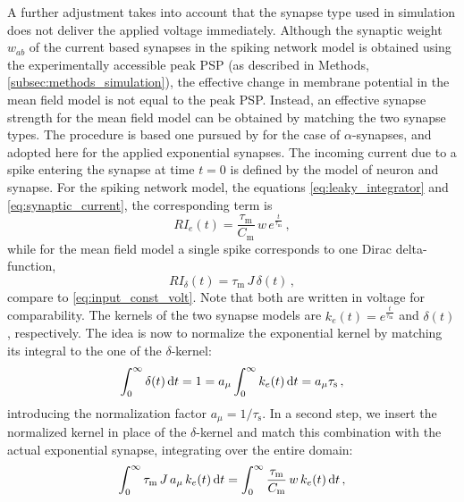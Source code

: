 A further adjustment takes into account that the synapse type used in simulation does not
deliver the applied voltage immediately. Although the synaptic weight $w_{ab}$ of the 
current based synapses in the spiking network model is obtained using the experimentally 
accessible peak PSP (as described in Methods, \autoref{subsec:methods_simulation}), 
the effective change in membrane potential in the mean field model is not equal to the peak PSP. 
Instead, an effective synapse strength for the mean field model can be obtained by 
matching the two synapse types.
The procedure is based one pursued by 
for the case of $\alpha$-synapses, and adopted here for the applied 
exponential synapses. 
The incoming current due to a spike entering the synapse at time $t = 0$ is defined 
by the model of neuron and synapse. For the spiking network model, the equations 
\eqref{eq:leaky_integrator} and \eqref{eq:synaptic_current}, the corresponding term is
\begin{equation}
    RI_e(t) = \frac{\tau_\text{m}}{C_\text{m}} \,w \,e^{\frac{t}{\tau_\text{m}}}\,,
    \label{eq:input_exp}
\end{equation}
while for the mean field model a single spike corresponds to one Dirac delta-function, 
\begin{equation}
    RI_\delta(t) = \tau_\text{m} \, J \,\delta(t)\,,
    \label{eq:input_exp}
\end{equation}
compare to \autoref{eq:input_const_volt}. Note that both are written in voltage for 
comparability. The kernels of the two synapse models are $k_e(t) = e^{\frac{t}{\tau_\text{m}}}$
and $\delta(t)$, respectively. 
The idea is now to normalize the exponential kernel by matching its 
integral to the one of the $\delta$-kernel:
\begin{equation}
    \int_{0}^{\infty}\delta(t)\mathop{}\!\text{d} t 
        = 1 
        = a_\mu \int_{0}^{\infty}k_e(t)\mathop{}\!\text{d} t  
        = a_\mu \tau_\text{s} \,,
    \label{eq:match_k_e}
\end{equation}
introducing the normalization factor $a_\mu = 1 / \tau_\text{s} $. 
In a second step, we insert the normalized kernel
in place of the $\delta$-kernel and match this combination with the actual 
exponential syn\-apse, integrating over the entire domain:
\begin{equation}
    \int_{0}^{\infty} \tau_\text{m} \,J \,a_\mu\, k_e(t) \mathop{}\!\text{d} t 
        = \int_{0}^{\infty} \frac{\tau_\text{m} }{C_\text{m}} \,w\, k_e(t)\mathop{}\!\text{d} t  \,,
    \label{eq:match_syns}
\end{equation}
